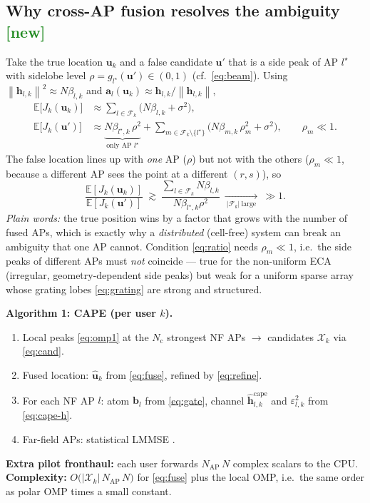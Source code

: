 \documentclass[11pt]{article}
\newcommand{\E}{\mathbb{E}}
\newcommand{\norm}[1]{\left\|#1\right\|}
\newcommand{\vh}{\mathbf{h}}
\newcommand{\va}{\mathbf{a}}
\newcommand{\vb}{\mathbf{b}}
\begin{document}
\subsection{Why cross-AP fusion resolves the ambiguity \textcolor{ForestGreen}{[new]}}
Take the true location $\mathbf u_k$ and a false candidate $\mathbf u'$ that is a side peak of AP
$l^\star$ with sidelobe level $\rho=g_{l^\star}(\mathbf u')\in(0,1)$ (cf.\ \eqref{eq:beam}). Using
$\norm{\vh_{l,k}}^2\!\approx\!N\beta_{l,k}$ and $\va_l(\mathbf u_k)\!\approx\!\vh_{l,k}/\norm{\vh_{l,k}}$,
\begin{align}
\E\big[J_k(\mathbf u_k)\big]&\approx\sum_{l\in\mathcal F_k}\big(N\beta_{l,k}+\sigma^2\big),
\label{eq:Jtrue}\\
\E\big[J_k(\mathbf u')\big]&\approx\underbrace{N\beta_{l^\star,k}\,\rho^2}_{\text{only AP }l^\star}
+\sum_{m\in\mathcal F_k\setminus\{l^\star\}}\big(N\beta_{m,k}\,\rho_m^2+\sigma^2\big),
\qquad \rho_m\ll 1 .
\label{eq:Jfalse}
\end{align}
The false location lines up with \emph{one} AP ($\rho$) but not with the others
($\rho_m\!\ll\!1$, because a different AP sees the point at a different $(r,s)$), so
\begin{equation}
\frac{\E[J_k(\mathbf u_k)]}{\E[J_k(\mathbf u')]}\ \gtrsim\
\frac{\sum_{l\in\mathcal F_k} N\beta_{l,k}}{N\beta_{l^\star,k}\rho^2}
\ \xrightarrow[\ |\mathcal F_k|\ \text{large}\ ]{}\ \gg 1 .
\label{eq:ratio}
\end{equation}
\emph{Plain words:} the true position wins by a factor that grows with the number of fused APs,
which is exactly why a \emph{distributed} (cell-free) system can break an ambiguity that one AP
cannot. Condition \eqref{eq:ratio} needs $\rho_m\!\ll\!1$, i.e.\ the side peaks of different APs must
\emph{not} coincide --- true for the non-uniform ECA (irregular, geometry-dependent side peaks) but
weak for a uniform sparse array whose grating lobes \eqref{eq:grating} are strong and structured.

\begin{algbox}
\textbf{Algorithm 1: CAPE (per user $k$).}
\begin{enumerate}[leftmargin=1.5em,itemsep=1pt,topsep=2pt]
\item Local peaks \eqref{eq:omp1} at the $N_{\mathrm c}$ strongest NF APs $\to$ candidates
      $\mathcal X_k$ via \eqref{eq:cand}.
\item Fused location: $\hat{\mathbf u}_k$ from \eqref{eq:fuse}, refined by \eqref{eq:refine}.
\item For each NF AP $l$: atom $\vb_l$ from \eqref{eq:gate}, channel $\hat{\vh}^{\mathrm{cape}}_{l,k}$
      and $\varepsilon_{l,k}^2$ from \eqref{eq:cape-h}.
\item Far-field APs: statistical LMMSE \cite{bjornson2021primer}.
\end{enumerate}
\textbf{Extra pilot fronthaul:} each user forwards $N_{\mathrm{AP}}\,N$ complex scalars to the CPU.\\
\textbf{Complexity:} $O\!\big(|\mathcal X_k|\,N_{\mathrm{AP}}\,N\big)$ for \eqref{eq:fuse} plus the
local OMP, i.e.\ the same order as polar OMP times a small constant.
\end{algbox}
\end{document}
